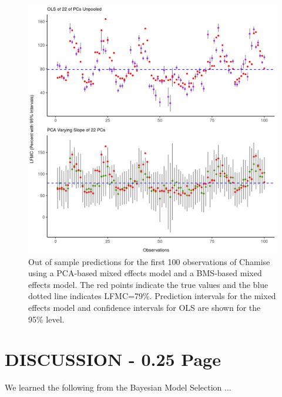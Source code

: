 \documentclass[twocolumn,10pt]{article}
\begin{document}
\begin{figure}
    \centering
    \includegraphics[scale=0.85, height=0.4\textheight]{figures/mixed_effects/sageblack_ols_pca_comparison_chamise.png}
    \caption{Out of sample predictions for the first 100 observations of Chamise using a PCA-based mixed effects model and a BMS-based mixed effects model. The red points indicate the true values and the blue dotted line indicates LFMC=79\%. Prediction intervals for the mixed effects model and confidence intervals for OLS are shown for the 95\% level. }
    \label{fig:ols_vs_pca}
\end{figure}



\section{DISCUSSION - 0.25 Page}
We learned the following from the Bayesian Model Selection ... %
\end{document}
